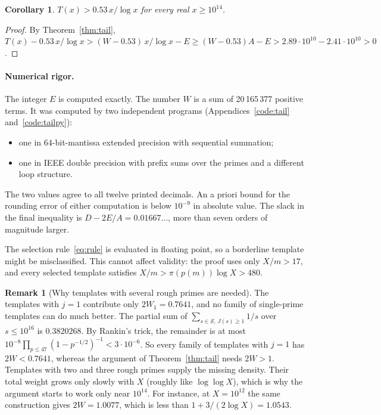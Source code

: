 \documentclass[11pt,a4paper]{article}
\newtheorem{corollary}[theorem]{Corollary}
\theoremstyle{definition}
\newtheorem{remark}[theorem]{Remark}
\newcommand{\cS}{\mathcal S}
\begin{document}
\begin{corollary}
$T(x)>0.53\,x/\log x$ for every real $x\ge10^{14}$.
\end{corollary}

\begin{proof}
By Theorem~\ref{thm:tail}, $T(x)-0.53\,x/\log x>(W-0.53)\,x/\log x-E\ge(W-0.53)A-E>2.89\cdot10^{10}-2.41\cdot10^{10}>0$.
\end{proof}

\paragraph{Numerical rigor.} The integer $E$ is computed exactly. The number $W$ is a sum of 20\,165\,377 positive terms. It was computed by two independent programs (Appendices~\ref{code:tail} and~\ref{code:tailpy}):
\begin{itemize}
\item one in $64$-bit-mantissa extended precision with sequential summation;
\item one in IEEE double precision with prefix sums over the primes and a different loop structure.
\end{itemize}
The two values agree to all twelve printed decimals. An a priori bound for the rounding error of either computation is below $10^{-9}$ in absolute value. The slack in the final inequality is $D-2E/A=0.01667\ldots$, more than seven orders of magnitude larger.

The selection rule~\eqref{eq:rule} is evaluated in floating point, so a borderline template might be misclassified. This cannot affect validity: the proof uses only $X/m>17$, and every selected template satisfies $X/m>\pi(p(m))\log X>480$.

\begin{remark}[Why templates with several rough primes are needed]
The templates with $j=1$ contribute only $2W_1=0.7641$, and no family of single-prime templates can do much better. The partial sum of $\sum_{s\in\cS,\,J(s)\ge1}1/s$ over $s\le10^{16}$ is $0.3820268$. By Rankin's trick, the remainder is at most $10^{-8}\prod_{p\le47}(1-p^{-1/2})^{-1}<3\cdot10^{-6}$. So every family of templates with $j=1$ has $2W<0.7641$, whereas the argument of Theorem~\ref{thm:tail} needs $2W>1$. Templates with two and three rough primes supply the missing density. Their total weight grows only slowly with $X$ (roughly like $\log\log X$), which is why the argument starts to work only near $10^{14}$. For instance, at $X=10^{12}$ the same construction gives $2W=1.0077$, which is less than $1+3/(2\log X)=1.0543$.
\end{remark}
\end{document}
